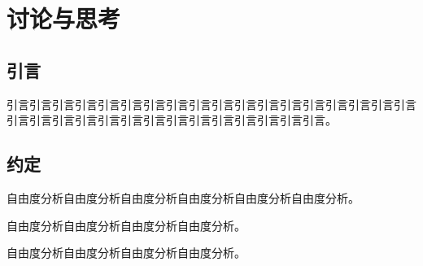 
\chapter{讨论与思考}
\label{cha:Chapter4}


\section{引言}
\label{sec:4_Introduction}

引言引言引言引言引言引言引言引言引言引言引言引言引言引言引言引言引言引言引言引言引言引言引言引言引言引言引言引言引言引言引言引言。



\section{约定}
\label{sec:4_AnalysisDOF}

自由度分析自由度分析自由度分析自由度分析自由度分析自由度分析。


\begin{convention}
\label{4_Convention1}
自由度分析自由度分析自由度分析自由度分析。
\end{convention}


\begin{convention}
\label{4_Convention2}
自由度分析自由度分析自由度分析自由度分析。
\end{convention}


